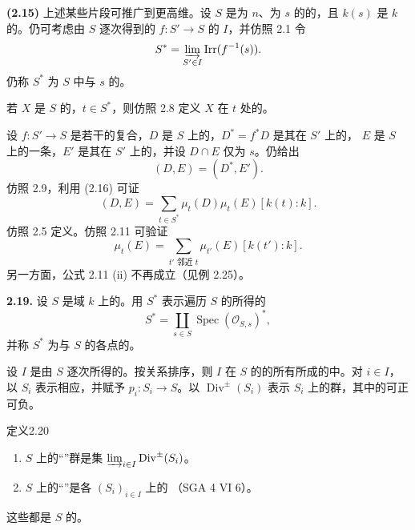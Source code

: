 \textbf{(2.15)} 上述某些片段可推广到更高维。设 $S$ 是为 $n$、为 $s$ 的的，且 $k(s)$ 是 $k$ 的。仍可考虑由 $S$ 逐次得到的 $f:S'\to S$ 的 $I$，并仿照 2.1 令
\[
S^*=\varinjlim_{S'\in I}\operatorname{Irr}(f^{-1}(s)).
\]
仍称 $S^*$ 为 $S$ 中与 $s$ 的。

若 $X$ 是 $S$ 的，$t\in S^*$，则仿照 2.8 定义 $X$ 在 $t$ 处的。

设 $f:S'\to S$ 是若干的复合，$D$ 是 $S$ 上的，$D^*=f^*D$ 是其在 $S'$ 上的，
$E$ 是 $S$ 上的一条，$E'$ 是其在 $S'$ 上的，并设 $D\cap E$ 仅为 $s$。仍给出
\[
(D,E)=(D^*,E').\tag{2.16}
\]
仿照 2.9，利用 (2.16) 可证
\[
(D,E)=\sum_{t\in S^*}\mu_t(D)\mu_t(E)[k(t):k].\tag{2.17}
\]
仿照 2.5 定义。仿照 2.11 可验证
\[
\mu_t(E)=\sum_{t'\text{ 邻近 }t}\mu_{t'}(E)[k(t'):k].\tag{2.18}
\]
另一方面，公式 2.11 (ii) 不再成立（见例 2.25）。

\textbf{2.19.} 设 $S$ 是域 $k$ 上的。用 $S^*$ 表示遍历 $S$ 的所得的
\[
S^*=\coprod_{s\in S}\operatorname{Spec}(\mathcal O_{S,s})^*,
\]
并称 $S^*$ 为与 $S$ 的各点的。

设 $I$ 是由 $S$ 逐次所得的。按关系排序，则 $I$ 在 $S$ 的的所有所成的中。对 $i\in I$，以 $S_i$ 表示相应，并赋予 $p_i:S_i\to S$。以 $\operatorname{Div}^{\pm}(S_i)$ 表示 $S_i$ 上的群，其中的可正可负。

\begin{SGAresult}{定义}{2.20}
\begin{enumerate}
\item[(i)] $S$ 上的“”群是集
$\varinjlim_{i\in I}\operatorname{Div}^{\pm}(S_i)$。
\item[(ii)] $S$ 上的“”是各 $(S_i)_{i\in I}$ 上的
（SGA 4 VI 6）。
\end{enumerate}
\end{SGAresult}
这些都是 $S$ 的。

